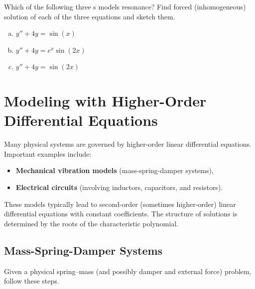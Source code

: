   \begin{question}
    Which of the following three \ode{}s models resonance?  Find forced (inhomogeneous) solution of each of the three equations and sketch them.
    \begin{enumerate}[(a)]
      \item \(y'' + 4y = \sin(x)\)
      \item \(y'' + 4y = e^{x}\sin(2x)\)
      \item \(y'' + 4y = \sin(2x)\)
    \end{enumerate}
  \end{question}



\section*{Modeling with Higher-Order Differential Equations}
  Many physical systems are governed by higher-order linear differential equations.  
  Important examples include:
  \begin{itemize}
    \item \textbf{Mechanical vibration models} (mass-spring-damper systems),
    \item \textbf{Electrical circuits} (involving inductors, capacitors, and resistors).
  \end{itemize}

  These models typically lead to second-order (sometimes higher-order) linear differential equations with constant coefficients. The structure of solutions is determined by the roots of the characteristic polynomial.

  \subsection*{Mass-Spring-Damper Systems}
    Given a physical spring--mass (and possibly damper and external force) problem, follow these steps.

